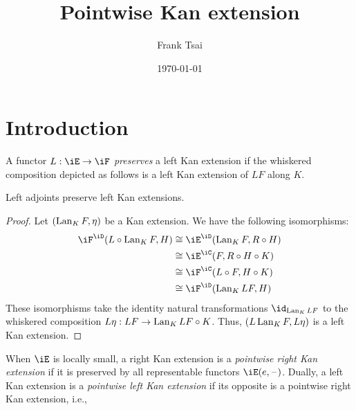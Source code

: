 \documentclass{amsart}
\title{Pointwise Kan extension}
\author{Frank Tsai}
\date{\today}
\begin{document}
\maketitle
\tableofcontents

\section{Introduction}
\label{sec:introduction}

\begin{defn}
  A functor $L : \iE \to \iF$ \emph{preserves} a left Kan extension if the whiskered composition depicted as follows is a left Kan extension of $LF$ along $K$.
  \[\]
\end{defn}

\begin{lem}
  Left adjoints preserve left Kan extensions.
\end{lem}
\begin{proof}
  Let $(\operatorname{Lan}_{K}F, \eta)$ be a Kan extension.
  We have the following isomorphisms:
  \begin{align}
    \iF^{\iD}(L \circ \lan_{K}F, H) &\iso \iE^{\iD}(\lan_{K}F, R \circ H)\\
                                &\iso \iE^{\iC}(F, R \circ H \circ K)\\
                                &\iso \iF^{\iC}(L \circ F, H \circ K)\\
                                &\iso \iF^{\iD}(\lan_{K} LF, H)
  \end{align}
  These isomorphisms take the identity natural transformations $\id_{\lan_{K}LF}$ to the whiskered composition $L\eta : LF \to \operatorname{Lan}_{K}LF \circ K$.
  Thus, $(L\operatorname{Lan}_{K}F, L\eta)$ is a left Kan extension.
\end{proof}

\begin{defn}
  When $\iE$ is locally small, a right Kan extension is a \emph{pointwise right Kan extension} if it is preserved by all representable functors $\iE(e,\blank)$.
  Dually, a left Kan extension is a \emph{pointwise left Kan extension} if its opposite is a pointwise right Kan extension, i.e.,
  \[\]
\end{defn}
\end{document}
